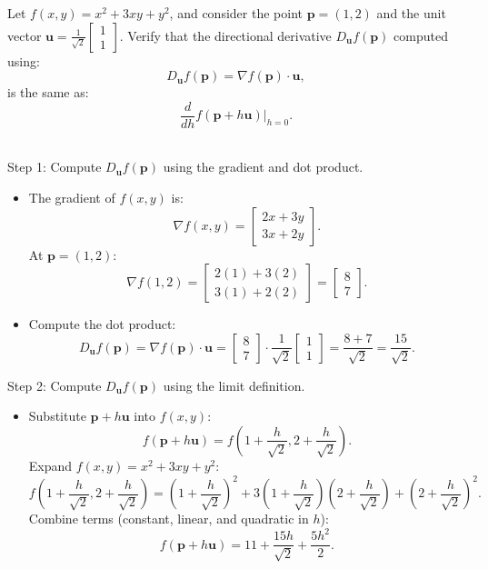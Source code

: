 \exampleline
\begin{example}
Let \( f(x, y) = x^2 + 3xy + y^2 \), and consider the point \( \mathbf{p} = (1, 2) \) and the unit vector \( \mathbf{u} = \frac{1}{\sqrt{2}} \begin{bmatrix} 1 \\ 1 \end{bmatrix} \). Verify that the directional derivative \( D_{\mathbf{u}} f(\mathbf{p}) \) computed using:
\[
D_{\mathbf{u}} f(\mathbf{p}) = \nabla f(\mathbf{p}) \cdot \mathbf{u},
\]
is the same as:
\[
\frac{d}{dh} f(\mathbf{p} + h \mathbf{u}) \bigg|_{h=0}.
\]

\begin{solution} \\
Step 1: Compute \( D_{\mathbf{u}} f(\mathbf{p}) \) using the gradient and dot product.
\begin{itemize}
    \item The gradient of \( f(x, y) \) is:
    \[
    \nabla f(x, y) = \begin{bmatrix} 2x + 3y \\ 3x + 2y \end{bmatrix}.
    \]
    At \( \mathbf{p} = (1, 2) \):
    \[
    \nabla f(1, 2) = \begin{bmatrix} 2(1) + 3(2) \\ 3(1) + 2(2) \end{bmatrix} = \begin{bmatrix} 8 \\ 7 \end{bmatrix}.
    \]

    \item Compute the dot product:
    \[
    D_{\mathbf{u}} f(\mathbf{p}) = \nabla f(\mathbf{p}) \cdot \mathbf{u} = \begin{bmatrix} 8 \\ 7 \end{bmatrix} \cdot \frac{1}{\sqrt{2}} \begin{bmatrix} 1 \\ 1 \end{bmatrix} = \frac{8 + 7}{\sqrt{2}} = \frac{15}{\sqrt{2}}.
    \]
\end{itemize}

Step 2: Compute \( D_{\mathbf{u}} f(\mathbf{p}) \) using the limit definition.
\begin{itemize}
    \item Substitute \( \mathbf{p} + h \mathbf{u} \) into \( f(x, y) \):
    \[
    f(\mathbf{p} + h \mathbf{u}) = f\left( 1 + \frac{h}{\sqrt{2}}, 2 + \frac{h}{\sqrt{2}} \right).
    \]
    Expand \( f(x, y) = x^2 + 3xy + y^2 \):
    \[
    f\left( 1 + \frac{h}{\sqrt{2}}, 2 + \frac{h}{\sqrt{2}} \right) = \left(1 + \frac{h}{\sqrt{2}}\right)^2 + 3\left(1 + \frac{h}{\sqrt{2}}\right)\left(2 + \frac{h}{\sqrt{2}}\right) + \left(2 + \frac{h}{\sqrt{2}}\right)^2.
    \]
    Combine terms (constant, linear, and quadratic in \( h \)):
    \[
    f(\mathbf{p} + h \mathbf{u}) = 11 + \frac{15h}{\sqrt{2}} + \frac{5h^2}{2}.
    \]


\end{itemize}
\end{solution}
\end{example}
